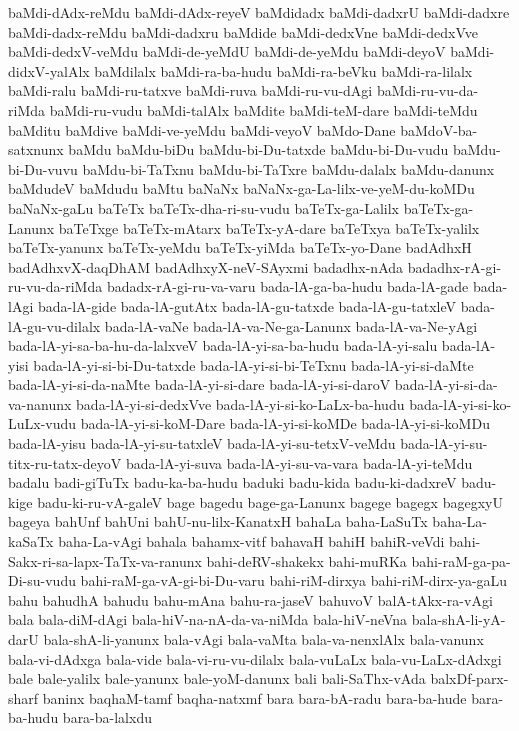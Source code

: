 {baMdi-dAdx-reMdu
baMdi-dAdx-reyeV
baMdidadx
baMdi-dadxrU
baMdi-dadxre
baMdi-dadx-reMdu
baMdi-dadxru
baMdide
baMdi-dedxVne
baMdi-dedxVve
baMdi-dedxV-veMdu
baMdi-de-yeMdU
baMdi-de-yeMdu
baMdi-deyoV
baMdi-didxV-yalAlx
baMdilalx
baMdi-ra-ba-hudu
baMdi-ra-beVku
baMdi-ra-lilalx
baMdi-ralu
baMdi-ru-tatxve
baMdi-ruva
baMdi-ru-vu-dAgi
baMdi-ru-vu-da-riMda
baMdi-ru-vudu
baMdi-talAlx
baMdite
baMdi-teM-dare
baMdi-teMdu
baMditu
baMdive
baMdi-ve-yeMdu
baMdi-veyoV
baMdo-Dane
baMdoV-ba-satxnunx
baMdu
baMdu-biDu
baMdu-bi-Du-tatxde
baMdu-bi-Du-vudu
baMdu-bi-Du-vuvu
baMdu-bi-TaTxnu
baMdu-bi-TaTxre
baMdu-dalalx
baMdu-danunx
baMdudeV
baMdudu
baMtu
baNaNx
baNaNx-ga-La-lilx-ve-yeM-du-koMDu
baNaNx-gaLu
baTeTx
baTeTx-dha-ri-su-vudu
baTeTx-ga-Lalilx
baTeTx-ga-Lanunx
baTeTxge
baTeTx-mAtarx
baTeTx-yA-dare
baTeTxya
baTeTx-yalilx
baTeTx-yanunx
baTeTx-yeMdu
baTeTx-yiMda
baTeTx-yo-Dane
badAdhxH
badAdhxvX-daqDhAM
badAdhxyX-neV-SAyxmi
badadhx-nAda
badadhx-rA-gi-ru-vu-da-riMda
badadx-rA-gi-ru-va-varu
bada-lA-ga-ba-hudu
bada-lA-gade
bada-lAgi
bada-lA-gide
bada-lA-gutAtx
bada-lA-gu-tatxde
bada-lA-gu-tatxleV
bada-lA-gu-vu-dilalx
bada-lA-vaNe
bada-lA-va-Ne-ga-Lanunx
bada-lA-va-Ne-yAgi
bada-lA-yi-sa-ba-hu-da-lalxveV
bada-lA-yi-sa-ba-hudu
bada-lA-yi-salu
bada-lA-yisi
bada-lA-yi-si-bi-Du-tatxde
bada-lA-yi-si-bi-TeTxnu
bada-lA-yi-si-daMte
bada-lA-yi-si-da-naMte
bada-lA-yi-si-dare
bada-lA-yi-si-daroV
bada-lA-yi-si-da-va-nanunx
bada-lA-yi-si-dedxVve
bada-lA-yi-si-ko-LaLx-ba-hudu
bada-lA-yi-si-ko-LuLx-vudu
bada-lA-yi-si-koM-Dare
bada-lA-yi-si-koMDe
bada-lA-yi-si-koMDu
bada-lA-yisu
bada-lA-yi-su-tatxleV
bada-lA-yi-su-tetxV-veMdu
bada-lA-yi-su-titx-ru-tatx-deyoV
bada-lA-yi-suva
bada-lA-yi-su-va-vara
bada-lA-yi-teMdu
badalu
badi-giTuTx
badu-ka-ba-hudu
baduki
badu-kida
badu-ki-dadxreV
badu-kige
badu-ki-ru-vA-galeV
bage
bagedu
bage-ga-Lanunx
bagege
bagegx
bagegxyU
bageya
bahUnf
bahUni
bahU-nu-lilx-KanatxH
bahaLa
baha-LaSuTx
baha-La-kaSaTx
baha-La-vAgi
bahala
bahamx-vitf
bahavaH
bahiH
bahiR-veVdi
bahi-Sakx-ri-sa-lapx-TaTx-va-ranunx
bahi-deRV-shakekx
bahi-muRKa
bahi-raM-ga-pa-Di-su-vudu
bahi-raM-ga-vA-gi-bi-Du-varu
bahi-riM-dirxya
bahi-riM-dirx-ya-gaLu
bahu
bahudhA
bahudu
bahu-mAna
bahu-ra-jaseV
bahuvoV
balA-tAkx-ra-vAgi
bala
bala-diM-dAgi
bala-hiV-na-nA-da-va-niMda
bala-hiV-neVna
bala-shA-li-yA-darU
bala-shA-li-yanunx
bala-vAgi
bala-vaMta
bala-va-nenxlAlx
bala-vanunx
bala-vi-dAdxga
bala-vide
bala-vi-ru-vu-dilalx
bala-vuLaLx
bala-vu-LaLx-dAdxgi
bale
bale-yalilx
bale-yanunx
bale-yoM-danunx
bali
bali-SaThx-vAda
balxDf-parx-sharf
baninx
baqhaM-tamf
baqha-natxmf
bara
bara-bA-radu
bara-ba-hude
bara-ba-hudu
bara-ba-lalxdu
}
